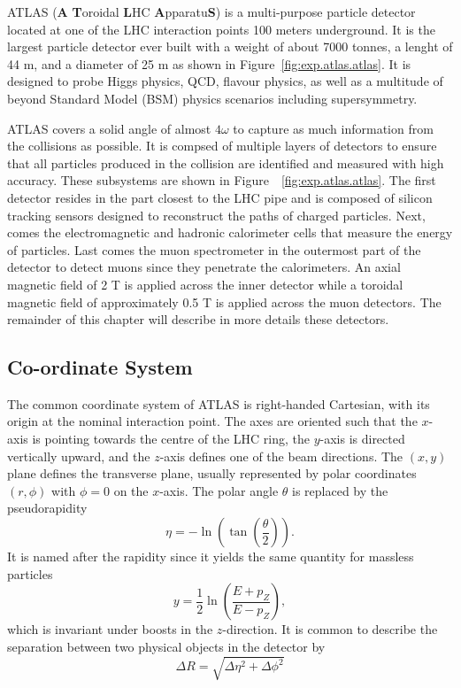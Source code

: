 ATLAS (\textbf{A} \textbf{T}oroidal \textbf{L}HC \textbf{A}pparatu\textbf{S}) is a 
multi-purpose particle detector located at one of the 
LHC interaction points 100 meters underground. 
It is the largest particle detector ever built with a weight of about 7000 tonnes, a lenght of 44 m, 
and a diameter of 25 m as shown in Figure~\ref{fig:exp.atlas.atlas}.
It is designed to probe Higgs physics, QCD, flavour physics, as well as a multitude of beyond Standard Model (BSM) physics scenarios including supersymmetry.

ATLAS covers a solid angle of almost $4\omega$ to capture as much information from the collisions 
as possible. 
It is compsed of multiple layers of detectors to ensure that all particles produced in the 
collision are identified and measured with high accuracy.
These subsystems are shown in Figure~~\ref{fig:exp.atlas.atlas}.
The first detector resides in the part closest to the
LHC pipe and is composed of silicon tracking sensors designed to reconstruct the paths
of charged particles. 
Next, comes the electromagnetic and hadronic calorimeter cells that 
measure the energy of particles. Last comes the muon spectrometer in the outermost part of the 
detector to detect muons since they penetrate the calorimeters. 
An axial magnetic field of 2 T is applied across the inner detector while a toroidal magnetic field 
of approximately 0.5 T is applied across the muon detectors.
The remainder of this chapter will describe in more details these detectors.

\subsection{Co-ordinate System}

The common coordinate system of ATLAS is right-handed Cartesian, 
with its origin at the nominal interaction point. 
The axes are oriented such that the $x$-axis is pointing towards the centre of the LHC ring, the $y$-axis is directed
vertically upward, and the $z$-axis defines one of the beam directions.
The $(x, y)$ plane defines the transverse plane, usually represented by polar coordinates $(r,\phi)$
with $\phi=0$ on the $x$-axis.
The polar angle $\theta$ is replaced by the pseudorapidity
\begin{equation}
\eta = - \ln\left(\tan\left(\frac{\theta}{2}\right)\right).
\end{equation}
It is named after the rapidity since it yields the same quantity for massless particles
\begin{equation}
y = \frac{1}{2}\ln\left(\frac{E+p_Z}{E-p_Z}\right),
\end{equation}
which is invariant under boosts in the $z$-direction.
It is common to describe the separation between two physical objects in the detector by 
\begin{equation}
\Delta R = \sqrt{\Delta \eta^2 + \Delta \phi^2}
\end{equation}



